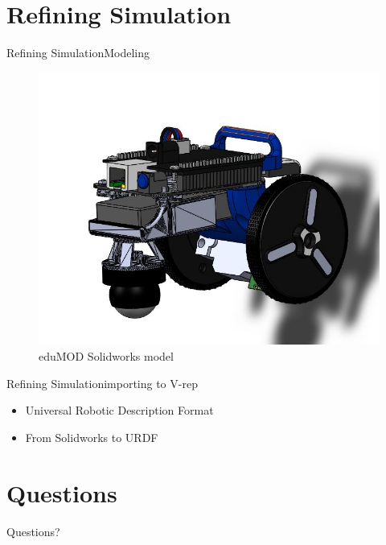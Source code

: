 \documentclass{beamer}
\begin{document}
\section{Refining Simulation}
\begin{frame}{Refining Simulation}{Modeling}
\begin{center}
\begin{figure}
\includegraphics[scale=0.3]{figs/img/solidworks.JPG}
\caption{eduMOD Solidworks model}
\end{figure}
\end{center}
\end{frame}
\begin{frame}{Refining Simulation}{importing to V-rep}
\begin{center}
\begin{itemize}
\item Universal Robotic Description Format
\item From Solidworks to URDF
\end{itemize}
\end{center}
\end{frame}
\section*{Questions}
\begin{frame}
\begin{LARGE}
\begin{center}
Questions?
\end{center}
\end{LARGE}
\end{frame}
\end{document}
